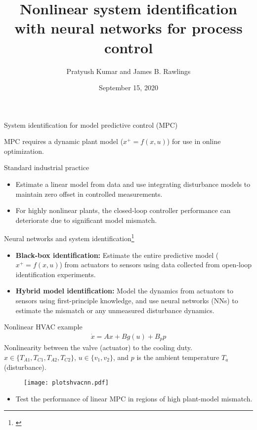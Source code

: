 \documentclass[xcolor=dvipsnames, 8pt]{beamer} %
\title[Nonlinear system identification with neural networks for 
process control]{Nonlinear system identification with neural networks for 
process control}
\date{September 15, 2020}
\author[Kumar and Rawlings]{\large Pratyush Kumar and James B. Rawlings}
\institute[UCSB]{
	\begin{minipage}{4in}
		\vspace{-10pt}
		\centering
		\raisebox{-0.1\height}{\texttt{[image: UCSB\_seal]}}
	\end{minipage}
	\vspace{10pt}
	\newline
	{\large Department of Chemical Engineering}
	\vspace{10pt}
	\newline
	{\large TWCCC Meeting (Virtual)}}
\begin{document}
\frame{\titlepage}

\begin{frame}{System identification for model predictive control (MPC)}

MPC requires a dynamic plant model ($x^+ = f(x, u)$) for use in online optimization.  

	\begin{block}{Standard industrial practice}
		\begin{itemize}
			\item Estimate a linear model from data and use integrating disturbance models to maintain zero offset 
			in controlled measurements.
			\item For highly nonlinear plants, the closed-loop controller performance can deteriorate due to significant model mismatch. 
		\end{itemize}
	\end{block}
	
	\begin{block}{Neural networks and system identification\footnote[frame]{\cite{hussain:1999, draeger:engell:ranke:1995, prasad:bequette:2003, eaton:rawlings:ungar:1994, bhat:minderman:mcavoy:wang:1990}}}
		\begin{itemize}
			\item \textbf{Black-box identification:} Estimate the entire predictive model ($x^+ =  f(x, u)$) from actuators to
			sensors using data collected from open-loop identification experiments.
			\item \textbf{Hybrid model identification:} Model the dynamics from actuators to sensors using first-principle knowledge, and use
			neural networks (NNs) to estimate the mismatch or any unmeasured disturbance dynamics.  
		\end{itemize}
	\end{block}
\end{frame}

\begin{frame}{Nonlinear HVAC example}
	\begin{align*}
	\dot{x} = Ax + Bg(u) + B_pp
	\end{align*}
	Nonlinearity between the valve (actuator) to the cooling duty. $x \in \{ T_{A1}, T_{C1}, T_{A2}, T_{C2} \}$, $u \in \{v_1, v_2\}$,
	and $p$ is the ambient temperature $T_a$ (disturbance).
	\begin{figure}[!h]
		\centering
		\texttt{[image: plotshvacnn.pdf]}
	\end{figure}
	\vspace{-0.1in}
	\begin{itemize}
		\item Test the performance of linear MPC in regions of high plant-model mismatch.
	\end{itemize}
\end{frame}
	
\end{document}
